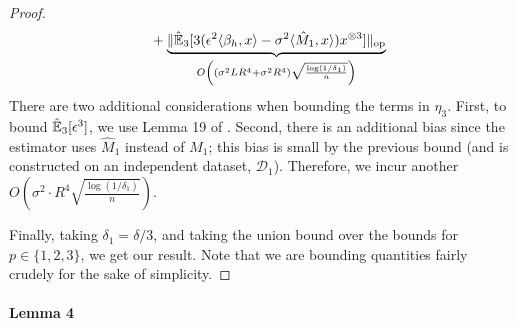 \documentclass[tablecaption=bottom]{jmlr}
\newcommand\sD{\ensuremath{\mathcal{D}}}
\newcommand\op{{\textrm{op}}}
\begin{document}
\begin{proof}
{\begin{align*}
   &\quad + \underbrace{ \|\hat\E_3[3(\epsilon^2 \innerp{\beta_h}{x} -\sigma^2 \innerp{\hat M_1}{x}) x\tp{3}]\|_\op }_{O\left( (\sigma^2 L R^4 + \sigma^2 R^4) \sqrt{\frac{\log(1/\delta_1)}{n}} \right) } \\
\end{align*}
}
There are two additional considerations when bounding the terms in $\eta_3$.
First, to bound $\hat{\operatorname{\mathbb{E}}}_3[\epsilon^3]$, we use Lemma 19 of \cite{hsu13spherical}.
Second, there is an additional bias since the estimator uses $\hat M_1$ instead of $M_1$; this bias is small by the previous bound (and is constructed on an independent dataset, $\sD_1$).
Therefore, we incur another $O(\sigma^2 \cdot R^4 \sqrt{\frac{\log(1/\delta_1)}{n}})$.

Finally, taking $\delta_1 = \delta/3$, and taking the union bound over the bounds for $p \in \{1,2,3\}$,
we get our result.
Note that we are bounding quantities fairly crudely for the sake of simplicity.
\end{proof}

\paragraph{Lemma 4}
\end{document}
